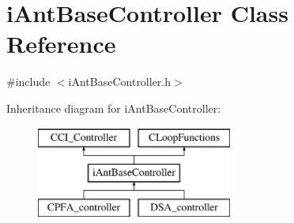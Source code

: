 \hypertarget{classi_ant_base_controller}{}\section{i\+Ant\+Base\+Controller Class Reference}
\label{classi_ant_base_controller}


{\ttfamily \#include $<$i\+Ant\+Base\+Controller.\+h$>$}

Inheritance diagram for i\+Ant\+Base\+Controller\+:\begin{figure}[H]
\begin{center}
\leavevmode
\includegraphics[height=3.000000cm]{classi_ant_base_controller}
\end{center}
\end{figure}
